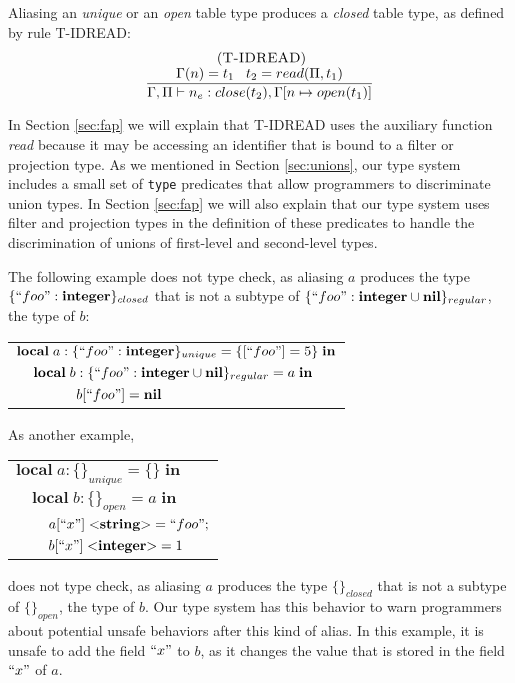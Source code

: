 Aliasing an \emph{unique} or an \emph{open} table type produces a
\emph{closed} table type, as defined by rule \textsc{T-IDREAD}:
\[
\begin{array}{c}
\; (\textsc{T-IDREAD})\\
\dfrac{\Gamma(n) = t_{1} \;\;\; t_{2} = read(\Pi, t_{1})}
      {\Gamma, \Pi \vdash n_{e}:close(t_{2}), \Gamma[n \mapsto open(t_{1})]}
\end{array}
\]

In Section \ref{sec:fap} we will explain that \textsc{T-IDREAD} uses
the auxiliary function \emph{read} because it may be accessing an
identifier that is bound to a filter or projection type.
As we mentioned in Section \ref{sec:unions}, our type system includes
a small set of \texttt{type} predicates that allow programmers to
discriminate union types.
In Section \ref{sec:fap} we will also explain that our type system
uses filter and projection types in the definition of these predicates
to handle the discrimination of unions of first-level and second-level
types.

The following example does not type check, as aliasing $a$ produces
the type $\{``foo":\mathbf{integer}\}_{closed}$ that is not a subtype of
$\{``foo":\mathbf{integer} \cup \mathbf{nil}\}_{regular}$, the type of $b$:
\begin{center}
\begin{tabular}{lll}
\multicolumn{3}{l}{$\mathbf{local} \; a:\{``foo":\mathbf{integer}\}_{unique} = \{ [``foo"] = 5 \} \; \mathbf{in}$}\\
& \multicolumn{2}{l}{$\mathbf{local} \; b:\{``foo":\mathbf{integer} \cup \mathbf{nil} \}_{regular} = a \; \mathbf{in}$}\\
& & \multicolumn{1}{l}{$b[``foo"] = \mathbf{nil}$}
\end{tabular}
\end{center}

As another example,
\begin{center}
\begin{tabular}{lll}
\multicolumn{3}{l}{$\mathbf{local} \; a:\{\}_{unique} = \{\} \; \mathbf{in}$}\\
& \multicolumn{2}{l}{$\mathbf{local} \; b:\{\}_{open} = a \; \mathbf{in}$}\\
& & \multicolumn{1}{l}{$a[``x"] \; {<}\mathbf{string}{>} = ``foo";$}\\
& & \multicolumn{1}{l}{$b[``x"] \; {<}\mathbf{integer}{>} = 1$}\\
\end{tabular}
\end{center}
does not type check, as aliasing $a$ produces the type $\{\}_{closed}$
that is not a subtype of $\{\}_{open}$, the type of $b$.
Our type system has this behavior to warn programmers about
potential unsafe behaviors after this kind of alias.
In this example, it is unsafe to add the field $``x"$ to $b$,
as it changes the value that is stored in the field $``x"$ of $a$.


